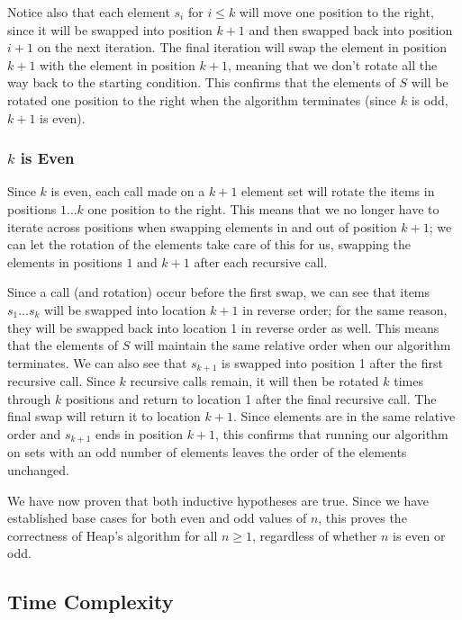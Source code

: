 \documentclass[10pt, oneside]{article}   	%
\begin{document}
Notice also that each element $s_{i}$ for $i \leq k$ will move one position to the right, since it will be swapped into position $k + 1$ and then swapped back into position $i + 1$ on the next iteration. The final iteration will swap the element in position $k + 1$ with the element in position $k + 1$, meaning that we don't rotate all the way back to the starting condition. This confirms that the elements of $S$ will be rotated one position to the right when the algorithm terminates (since $k$ is odd, $k + 1$ is even).

\subsubsection{$k$ is Even}

Since $k$ is even, each call made on a $k + 1$ element set will rotate the items in positions $1 \dots k$ one position to the right. This means that we no longer have to iterate across positions when swapping elements in and out of position $k + 1$; we can let the rotation of the elements take care of this for us, swapping the elements in positions $1$ and $k + 1$ after each recursive call.

Since a call (and rotation) occur before the first swap, we can see that items $s_{1} \dots s_{k}$ will be swapped into location $k + 1$ in reverse order; for the same reason, they will be swapped back into location 1 in reverse order as well. This means that the elements of $S$ will maintain the same relative order when our algorithm terminates. We can also see that $s_{k + 1}$ is swapped into position 1 after the first recursive call. Since $k$ recursive calls remain, it will then be rotated $k$ times through $k$ positions and return to location 1 after the final recursive call. The final swap will return it to location $k + 1$. Since elements are in the same relative order and $s_{k + 1}$ ends in position $k + 1$, this confirms that running our algorithm on sets with an odd number of elements leaves the order of the elements unchanged.

We have now proven that both inductive hypotheses are true. Since we have established base cases for both even and odd values of $n$, this proves the correctness of Heap's algorithm for all $n \geq 1$, regardless of whether $n$ is even or odd.

\subsection{Time Complexity}
\end{document}
